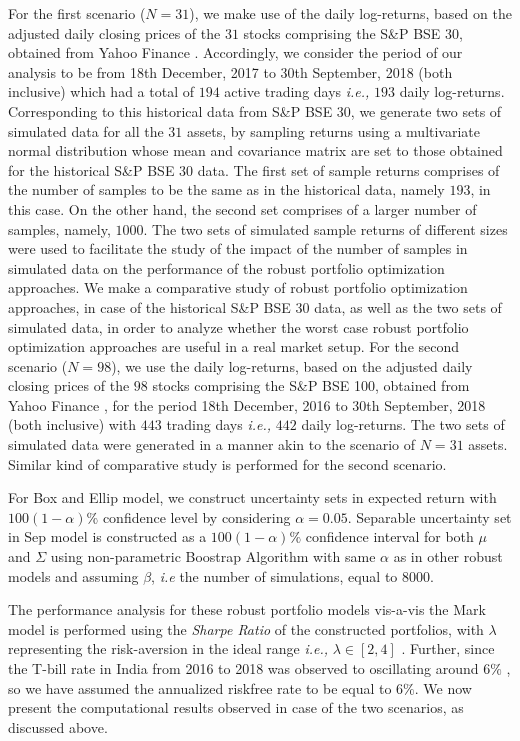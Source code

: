 \documentclass[12pt]{article}
\numberwithin{equation}{section}
\begin{document}
For the first scenario ($N=31$), we make use of the daily log-returns, based on the adjusted daily closing prices of the $31$ stocks comprising the S\&P BSE 30, obtained from Yahoo Finance \cite{yf}. Accordingly, we consider the period of our analysis to be from 18th December, 2017 to 30th September, 2018 (both inclusive) which had a total of $194$ active trading days \textit{i.e.,} $193$ daily log-returns. Corresponding to this historical data from S\&P BSE 30, we generate two sets of simulated data for all the $31$ assets, by sampling returns using a multivariate normal distribution whose mean and covariance matrix are set to those obtained for the historical S\&P BSE 30 data. The first set of sample returns comprises of the number of samples to be the same as in the historical data, namely $193$, in this case. On the other hand, the second set comprises of a larger number of samples, namely, $1000$. The two sets of simulated sample returns of different sizes were used to facilitate the study of the impact of the number of samples in simulated data on the performance of the robust portfolio optimization approaches. We make a comparative study of robust portfolio optimization approaches, in case of the historical S\&P BSE 30 data, as well as the two sets of simulated data, in order to analyze whether the worst case robust portfolio optimization approaches are useful in a real market setup. For the second scenario ($N=98$), we use the daily log-returns, based on the adjusted daily closing prices of the $98$ stocks comprising the S\&P BSE 100, obtained from Yahoo Finance \cite{yf}, for the period 18th December, 2016 to 30th September, 2018 (both inclusive) with $443$ trading days \textit{i.e.,} $442$ daily log-returns. The two sets of simulated data were generated in a manner akin to the scenario of $N=31$ assets. Similar kind of comparative study is performed for the second scenario.

For Box and Ellip model, we construct uncertainty sets in expected return with $100(1-\alpha)\%$ confidence level by considering $\alpha=0.05$. Separable uncertainty set in Sep model is constructed as a $100(1-\alpha)\%$ confidence interval for both $\mu$ and $\Sigma$ using non-parametric Boostrap Algorithm with same $\alpha$ as in other robust models and assuming $\beta$, \textit{i.e} the number of simulations, equal to $8000$.

The performance analysis for these robust portfolio models vis-a-vis the Mark model is performed using the \textit{Sharpe Ratio} of the constructed portfolios, with $\lambda$ representing the risk-aversion in the ideal range \textit{i.e.,} $\lambda \in [2,4]$ \cite{Fabozzi07}. Further, since the T-bill rate in India from 2016 to 2018 was observed to oscillating around $6\%$ \cite{rbi}, so we have assumed the annualized riskfree rate to be equal to $6\%$. We now present the computational results observed in case of the two scenarios, as discussed above.
\end{document}
